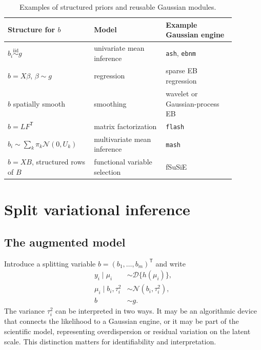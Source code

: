 \documentclass[11pt]{article}
\newcommand{\N}{\mathcal{N}}
\begin{document}
\begin{table}[ht]
\centering
\caption{Examples of structured priors and reusable Gaussian modules.}
\label{tab:gaussian-modules}
\begin{tabular}{>{\raggedright\arraybackslash}p{0.33\linewidth}
                >{\raggedright\arraybackslash}p{0.28\linewidth}
                >{\raggedright\arraybackslash}p{0.27\linewidth}}
\toprule
Structure for $b$ & Model & Example Gaussian engine \\
\midrule
$b_i\overset{\mathrm{iid}}\sim g$ & univariate mean inference & \texttt{ash}, \texttt{ebnm} \\
$b=X\beta$, $\beta\sim g$ & regression & sparse EB regression \\
$b$ spatially smooth & smoothing & wavelet or Gaussian-process EB \\
$b=LF^\mathsf{T}$ & matrix factorization & \texttt{flash} \\
$b_i\sim\sum_k\pi_k\N(0,U_k)$ & multivariate mean inference & \texttt{mash} \\
$b=XB$, structured rows of $B$ & functional variable selection & fSuSiE \\
\bottomrule
\end{tabular}
\end{table}

\section{Split variational inference}

\subsection{The augmented model}

Introduce a splitting variable $b=(b_1,\ldots,b_m)^\mathsf{T}$ and write
\begin{align}
 y_i\mid\mu_i &\sim \mathcal{D}\{h(\mu_i)\}, \nonumber\\
 \mu_i\mid b_i,\tau_i^2 &\sim \N(b_i,\tau_i^2),
 \label{eq:split-model}\\
 b &\sim g. \nonumber
\end{align}
The variance $\tau_i^2$ can be interpreted in two ways. It may be an
algorithmic device that connects the likelihood to a Gaussian engine, or it
may be part of the scientific model, representing overdispersion or residual
variation on the latent scale. This distinction matters for identifiability
and interpretation.
\end{document}
